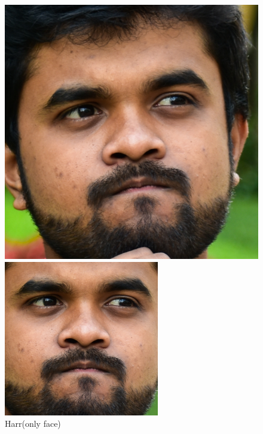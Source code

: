 \begin{figure}[!htb]
      \includegraphics[width=\linewidth]{Harr.png}
      \caption{Harr(only face)}\label{fig2}
    \endminipage\hfill
      \includegraphics[width=\linewidth]{Harr_eye.png}

\end{figure}
